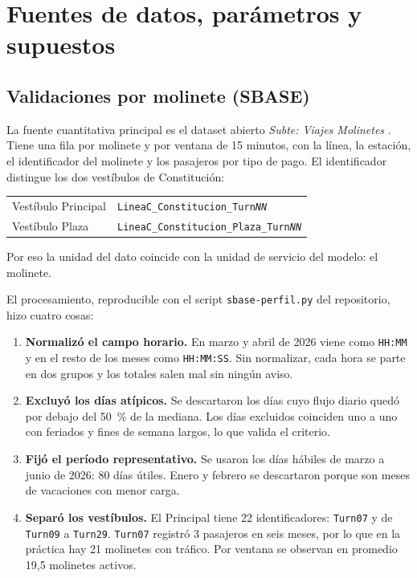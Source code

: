 \section{Fuentes de datos, parámetros y supuestos}
\label{anx:datos}

\subsection{Validaciones por molinete (SBASE)}
\label{anx:sbase}

La fuente cuantitativa principal es el dataset abierto \emph{Subte: Viajes Molinetes}
\parencite{sbase2026molinetes}. Tiene una fila por molinete y por ventana de 15 minutos, con la línea, la
estación, el identificador del molinete y los pasajeros por tipo de pago. El identificador distingue los
dos vestíbulos de Constitución:
\begin{center}
\small
\begin{tabular}{@{}ll@{}}
Vestíbulo Principal & \texttt{LineaC\_Constitucion\_Turn\textit{NN}} \\
Vestíbulo Plaza & \texttt{LineaC\_Constitucion\_Plaza\_Turn\textit{NN}} \\
\end{tabular}
\end{center}
Por eso la unidad del dato coincide con la unidad de servicio del modelo: el molinete.

El procesamiento, reproducible con el script \texttt{sbase-perfil.py} del repositorio, hizo cuatro cosas:
\begin{enumerate}
  \item \textbf{Normalizó el campo horario.} En marzo y abril de 2026 viene como \texttt{HH:MM} y en el
        resto de los meses como \texttt{HH:MM:SS}. Sin normalizar, cada hora se parte en dos grupos y los
        totales salen mal sin ningún aviso.
  \item \textbf{Excluyó los días atípicos.} Se descartaron los días cuyo flujo diario quedó por debajo del
        50~\% de la mediana. Los días excluidos coinciden uno a uno con feriados y fines de semana largos,
        lo que valida el criterio.
  \item \textbf{Fijó el período representativo.} Se usaron los días hábiles de marzo a junio de 2026:
        80 días útiles. Enero y febrero se descartaron porque son meses de vacaciones con menor carga.
  \item \textbf{Separó los vestíbulos.} El Principal tiene 22 identificadores: \texttt{Turn07} y de
        \texttt{Turn09} a \texttt{Turn29}. \texttt{Turn07} registró 3 pasajeros en seis meses, por lo que
        en la práctica hay 21 molinetes con tráfico. Por ventana se observan en promedio 19,5 molinetes
        activos.
\end{enumerate}

